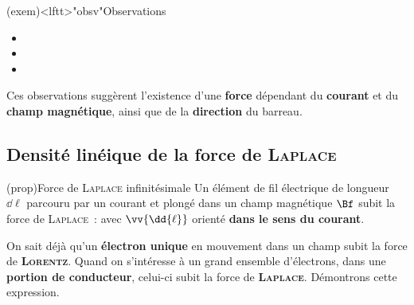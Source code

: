 \documentclass[../../main/main.tex]{subfiles}
\begin{document}
\begin{tcn}(exem)<lftt>"obsv"{Observations}
	\begin{itemize}
		\item {}%
		\item {}%
		\item {}%
	\end{itemize}
\end{tcn}

Ces observations suggèrent l'existence d'une \textbf{force} dépendant du
\textbf{courant} et du \textbf{champ magnétique}, ainsi que de la
\textbf{direction} du barreau.

\subsection{Densité linéique de la force de \textsc{Laplace}}
\label{ssec:flplliq}

\begin{tcb*}(prop){Force de \textsc{Laplace} infinitésimale}
	Un élément de fil électrique de longueur $\dd{\ell}$ parcouru par un courant et
	plongé dans un champ magnétique $\Bf$ subit la force de \textsc{Laplace}~:
	\psw{%
		\[
			\boxed{\dd{\vv{F_{\textsc{Laplace}}}} = i \vv{\dd{\ell}}\wedge \vv{B}}
		\]
	}%
	avec $\vv{\dd{\ell}}$ orienté \textbf{dans le sens du courant}.
\end{tcb*}
On sait déjà qu'un \textbf{électron unique} en mouvement dans un champ subit la
force de \textbf{\textsc{Lorentz}}. Quand on s'intéresse à un grand ensemble
d'électrons, dans une \textbf{portion de conducteur}, celui-ci subit la force de
\textbf{\textsc{Laplace}}. Démontrons cette expression.
\end{document}
